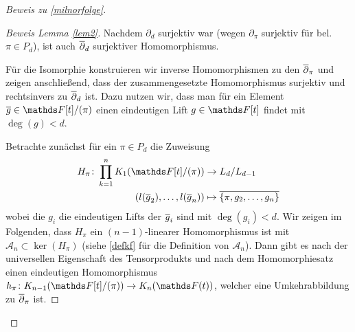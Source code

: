 \documentclass[ngerman,fontsize=11pt, paper=a4, parskip=half, titlepage=true, toc=bib]{scrartcl}
\begin{document}
\begin{proof}[Beweis zu \ref{milnorfolge}]
\begin{proof}[Beweis Lemma \ref{lem2}]
    Nachdem $\partial_d$ surjektiv war (wegen $\partial_\pi$ surjektiv
    für bel. $\pi\in P_d$), ist auch $\overline\partial_d$
    surjektiver Homomorphismus.
    
    Für die Isomorphie konstruieren wir inverse Homomorphismen 
    zu den $\overline\partial_\pi$ und zeigen anschließend, 
    dass der zusammengesetzte Homomorphismus surjektiv und
    rechtsinvers zu $\overline\partial_d$ ist.
    Dazu nutzen wir, dass man für ein Element $\ov g\in\Ftpi$ einen
    eindeutigen Lift $g\in\F[t]$ findet mit $\deg(g)<d$.
    
    Betrachte zunächst für ein $\pi\in P_d$ die Zuweisung
    \begin{align*}
      H_\pi\colon\prod_{k=1}^n \K_1(\Ftpi) 
      &\to L_d/L_{d-1}\\
      \left( l(\ov g_2),\dotsc, l(\ov g_n) \right)
      &\mapsto \ov{\{\pi,g_2,\dotsc,g_n\}}
    \end{align*}
    wobei die $g_i$ die eindeutigen Lifts der $\overline g_i$ sind mit $\deg(g_i)<d$.
    Wir zeigen im Folgenden, dass $H_\pi$ ein $(n-1)$-linearer
    Homomorphismus ist mit $\mathcal{A}_n\subset \ker(H_\pi)$ (siehe
    \ref{defkf} für die Definition von $\mathcal{A}_n$).
    Dann gibt es nach der universellen Eigenschaft des Tensorprodukts
    und nach dem Homomorphiesatz einen eindeutigen Homomorphismus 
    $h_\pi\colon\K_{n-1}(\Ftpi)\to\KnFt$,
    welcher eine Umkehrabbildung zu $\overline\partial_\pi$ ist.
    


\end{proof}
\end{proof}
\end{document}
